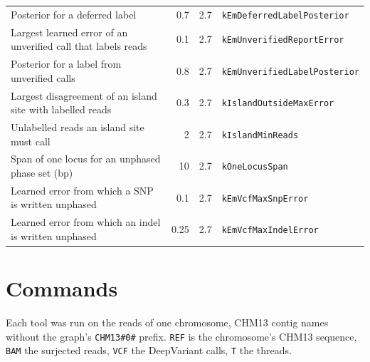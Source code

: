 \documentclass[10pt]{article}
\begin{document}
{\begin{longtable}{@{}>{\raggedright\arraybackslash}p{5.0cm}rrl@{}}
Posterior for a deferred label & 0.7 & 2.7 & \texttt{kEmDeferredLabelPosterior} \\
Largest learned error of an unverified call that labels reads & 0.1 & 2.7 & \texttt{kEmUnverifiedReportError} \\
Posterior for a label from unverified calls & 0.8 & 2.7 & \texttt{kEmUnverifiedLabelPosterior} \\
Largest disagreement of an island site with labelled reads & 0.3 & 2.7 & \texttt{kIslandOutsideMaxError} \\
Unlabelled reads an island site must call & 2 & 2.7 & \texttt{kIslandMinReads} \\
Span of one locus for an unphased phase set (bp) & 10 & 2.7 & \texttt{kOneLocusSpan} \\
Learned error from which a SNP is written unphased & 0.1 & 2.7 & \texttt{kEmVcfMaxSnpError} \\
Learned error from which an indel is written unphased & 0.25 & 2.7 & \texttt{kEmVcfMaxIndelError} \\
\bottomrule
\end{longtable}
}

\section{Commands}

Each tool was run on the reads of one chromosome, CHM13 contig names without the graph's \texttt{CHM13\#0\#} prefix. \texttt{REF} is the chromosome's CHM13 sequence, \texttt{BAM} the surjected reads, \texttt{VCF} the DeepVariant calls, \texttt{T} the threads.
\end{document}
